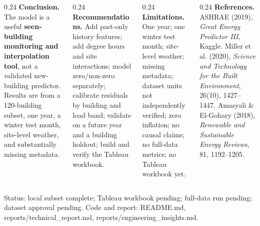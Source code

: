 \documentclass[final]{beamer}
\begin{document}
\begin{frame}[t]
\vspace{0.25cm}
\begin{tcolorbox}[colback=lightgrey,colframe=teal,boxrule=1pt,arc=2pt,left=5pt,right=5pt,top=3pt,bottom=3pt]
\small
\begin{columns}[t]
\begin{column}{0.24\linewidth}
\textbf{Conclusion.} The model is a useful \textbf{seen-building monitoring and interpolation tool}, not a validated new-building predictor. Results are from a 120-building subset, one year, a winter test month, site-level weather, and substantially missing metadata.
\end{column}
\begin{column}{0.24\linewidth}
\textbf{Recommendations.} Add past-only history features; add degree hours and site interactions; model zero/non-zero separately; calibrate residuals by building and load band; validate on a future year and a building holdout; build and verify the Tableau workbook.
\end{column}
\begin{column}{0.24\linewidth}
\textbf{Limitations.} One year; one winter test month; site-level weather; missing metadata; dataset units not independently verified; zero inflation; no causal claims; no full-data metrics; no Tableau workbook yet.
\end{column}
\begin{column}{0.24\linewidth}
\textbf{References.} ASHRAE (2019), \emph{Great Energy Predictor III}, Kaggle. Miller et al. (2020), \emph{Science and Technology for the Built Environment}, 26(10), 1427--1447. Amasyali \& El-Gohary (2018), \emph{Renewable and Sustainable Energy Reviews}, 81, 1192--1205.
\end{column}
\end{columns}
\vspace{0.08cm}
\scriptsize Status: local subset complete; Tableau workbook pending; full-data run pending; dataset approval pending. Code and report: README.md, reports/technical\_report.md, reports/engineering\_insights.md.
\end{tcolorbox}
\end{frame}
\end{document}

